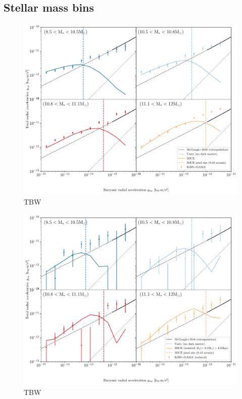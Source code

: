 \documentclass[fleqn,usenatbib]{mnras}
\begin{document}
\subsection{Stellar mass bins}

\begin{figure}
	\includegraphics[width=1.0\textwidth]{Figures/RAR_GAMA+MICE_4-massbins.pdf}
	\caption{TBW}
\end{figure}

\begin{figure}
	\includegraphics[width=1.0\textwidth]{Figures/RAR_GAMA+MICE_4-massbins_isolated_strong.pdf}
	\caption{TBW}
\end{figure}
\end{document}
